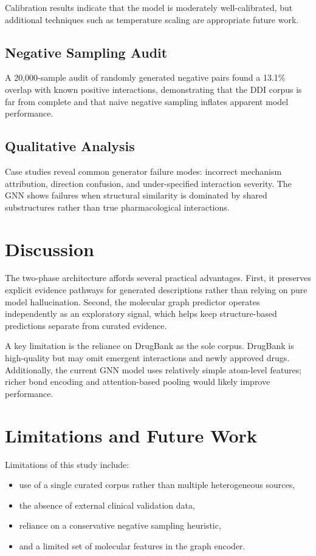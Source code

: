 \documentclass[conference]{IEEEtran}
\begin{document}
Calibration results indicate that the model is moderately well-calibrated, but additional techniques such as temperature scaling are appropriate future work.

\subsection{Negative Sampling Audit}
A 20,000-sample audit of randomly generated negative pairs found a 13.1\% overlap with known positive interactions, demonstrating that the DDI corpus is far from complete and that naive negative sampling inflates apparent model performance.

\subsection{Qualitative Analysis}
Case studies reveal common generator failure modes: incorrect mechanism attribution, direction confusion, and under-specified interaction severity. The GNN shows failures when structural similarity is dominated by shared substructures rather than true pharmacological interactions.

\section{Discussion}
The two-phase architecture affords several practical advantages. First, it preserves explicit evidence pathways for generated descriptions rather than relying on pure model hallucination. Second, the molecular graph predictor operates independently as an exploratory signal, which helps keep structure-based predictions separate from curated evidence.

A key limitation is the reliance on DrugBank as the sole corpus. DrugBank is high-quality but may omit emergent interactions and newly approved drugs. Additionally, the current GNN model uses relatively simple atom-level features; richer bond encoding and attention-based pooling would likely improve performance.

\section{Limitations and Future Work}
Limitations of this study include:
\begin{itemize}
    \item use of a single curated corpus rather than multiple heterogeneous sources,
    \item the absence of external clinical validation data,
    \item reliance on a conservative negative sampling heuristic,
    \item and a limited set of molecular features in the graph encoder.
\end{itemize}
\end{document}
